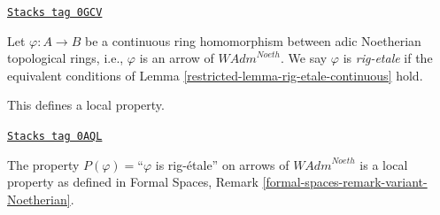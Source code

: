 \begin{definition}
\label{restricted-definition-rig-etale-continuous-homomorphism}
\href{https://stacks.math.columbia.edu/tag/0GCV}{\texttt{Stacks tag 0GCV}}

Let $\varphi : A \to B$ be a continuous ring homomorphism
between adic Noetherian topological rings, i.e., $\varphi$
is an arrow of $\textit{WAdm}^{Noeth}$. We say
$\varphi$ is {\it rig-etale} if the equivalent conditions
of Lemma \ref{restricted-lemma-rig-etale-continuous} hold.
\end{definition}

This defines a local property.

\begin{lemma}
\label{restricted-lemma-rig-etale-axioms}
\href{https://stacks.math.columbia.edu/tag/0AQL}{\texttt{Stacks tag 0AQL}}

The property $P(\varphi)=$``$\varphi$ is rig-\'etale'' on arrows
of $\textit{WAdm}^{Noeth}$ is a local property as defined in
Formal Spaces, Remark \ref{formal-spaces-remark-variant-Noetherian}.
\end{lemma}

